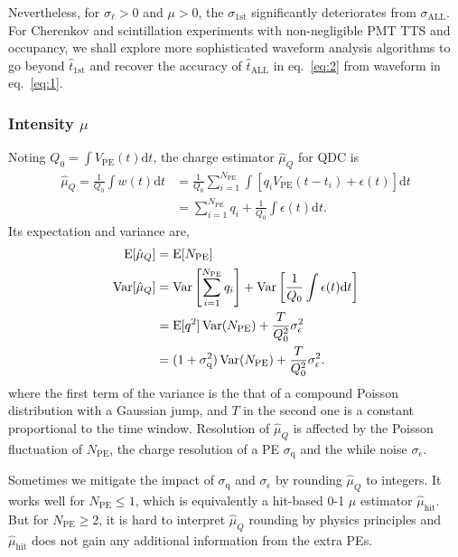 Nevertheless, for $\sigma_\ell > 0$ and $\mu >0$, the $\sigma_{\mathrm{1st}}$ significantly deteriorates from $\sigma_{\mathrm{ALL}}$.  For Cherenkov and scintillation experiments with non-negligible PMT TTS and occupancy, we shall explore more sophisticated waveform analysis algorithms to go beyond $\hat{t}_{\mathrm{1st}}$ and recover the accuracy of $\hat{t}_\mathrm{ALL}$ in eq.~\eqref{eq:2} from waveform in eq.~\eqref{eq:1}.

\subsubsection{Intensity $\mu$}
\label{sec:intensity-mu}

Noting $Q_0 = {\int V_\mathrm{PE}(t) \mathrm{d} t}$, the charge estimator $\hat{\mu}_Q$ for QDC is
\begin{equation}
  \begin{aligned}
  \label{eq:mu-q}
  \hat{\mu}_Q = \frac{1}{Q_0}\int w(t) \mathrm{d} t &= \frac{1}{Q_0}\sum_{i=1}^{N_\mathrm{PE}} \int \left[ q_i V_\mathrm{PE}(t-t_i) + \epsilon(t) \right] \mathrm{d} t \\
  & = \sum_{i=1}^{N_\mathrm{PE}} q_i + \frac{1}{Q_0} \int \epsilon(t) \mathrm{d} t.
  \end{aligned}
\end{equation}
Its expectation and variance are,
\begin{equation}
  \label{eq:energy}
  \begin{aligned}
    \operatorname{E}[\hat{\mu}_Q] &= \operatorname{E}[N_\mathrm{PE}] \\
    \operatorname{Var}[\hat{\mu}_Q] &= \operatorname{Var}\left[\sum_{i=1}^{N_\mathrm{PE}} q_i\right] + \operatorname{Var}\left[\frac{1}{Q_0} \int \epsilon(t) \mathrm{d} t\right] \\
    &= \operatorname{E}[q^2] \operatorname{Var}(N_\mathrm{PE}) + \frac{T}{Q_0^2} \sigma_\epsilon^2 \\
    &= (1 + \sigma_\mathrm{q}^2) \operatorname{Var}(N_\mathrm{PE}) + \frac{T}{Q_0^2} \sigma_\epsilon^2. \\
  \end{aligned}
\end{equation}
where the first term of the variance is the that of a compound Poisson distribution with a Gaussian jump, and $T$ in the second one is a constant proportional to the time window.  Resolution of $\hat{\mu}_Q$ is affected by the Poisson fluctuation of $N_\mathrm{PE}$, the charge resolution of a PE $\sigma_\mathrm{q}$ and the while noise $\sigma_\epsilon$.

Sometimes we mitigate the impact of $\sigma_\mathrm{q}$ and $\sigma_\epsilon$ by rounding $\hat{\mu}_Q$ to integers.  It works well for $N_\mathrm{PE} \le 1$, which is equivalently a hit-based 0-1 $\mu$ estimator $\hat{\mu}_\mathrm{hit}$.  But for $N_\mathrm{PE} \ge 2$, it is hard to interpret $\hat{\mu}_Q$ rounding by physics principles and $\hat{\mu}_\mathrm{hit}$ does not gain any additional information from the extra PEs.

